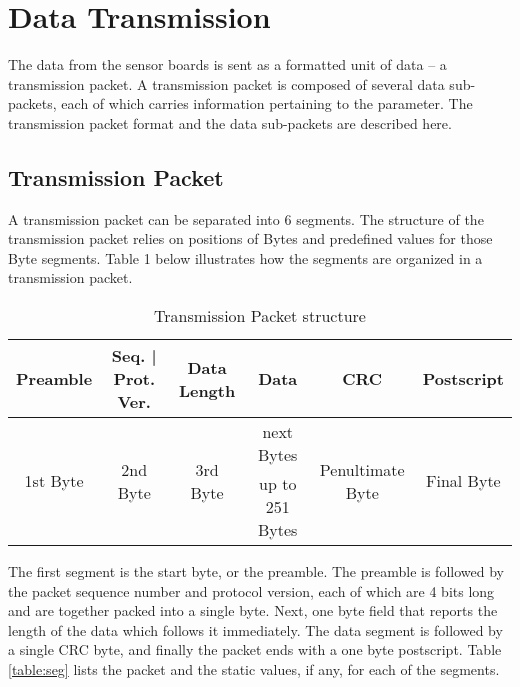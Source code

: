 \newpage
\section{Data Transmission} \label{section:overall}

The data from the sensor boards is sent as a formatted unit of data -- a transmission
packet. A transmission packet is composed of several data sub-packets, each
of which carries information pertaining to the parameter.
The transmission packet format and the data sub-packets are described here.

\subsection{Transmission Packet}
A transmission packet can be separated into 6 segments.
The structure of the transmission packet relies on positions of Bytes and predefined values for those Byte segments. 
Table 1 below illustrates how the segments are organized in a transmission packet.
\\

\begin{table}[h!]
    \centering
    \caption{Transmission Packet structure}
    \label{table:tran}
    \begin{tabular}{|c|c|c|c|c|c|}
        \hline
        \rowcolor{black!8}
        \textbf{Preamble} & \textbf{Seq. | Prot. Ver.} & \textbf{Data Length} & \textbf{Data} & \textbf{CRC} & \textbf{Postscript}\\
        \hline
        \multirow{2}{*}{1st Byte} & \multirow{2}{*}{2nd Byte} & \multirow{2}{*}{3rd Byte} & next Bytes & \multirow{2}{*}{Penultimate Byte} & \multirow{2}{*}{Final Byte} \\ 
        & & & up to 251 Bytes & & \\ \hline
    \end{tabular}
\end{table}


The first segment is the start byte, or the preamble. The preamble is followed by the packet sequence number and protocol
version, each of which are 4 bits long and are together packed into a single byte.
Next, one byte field that reports the length of the data which follows it
immediately. The data segment is followed by a single CRC byte, and finally the packet ends with a one byte
postscript. Table \ref{table:seg} lists the packet and the static values, if any, for each of the segments.
\\


